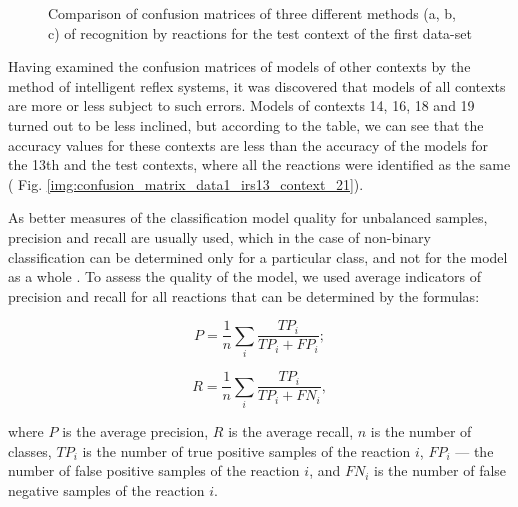 \begin{figure}[!t]
	\centering
	
	\caption{Comparison of confusion matrices of three different methods (a, b, c) of recognition by reactions for the test context of the first data-set}
	\label{img:confusion_matrix_data1_context_21}
\end{figure}

Having examined the confusion matrices of models of other contexts by the method of intelligent reflex systems, it was discovered that models of all contexts are more or less subject to such errors. Models of contexts 14, 16, 18 and 19 turned out to be less inclined, but according to the table, we can see that the accuracy values for these contexts are less than the accuracy of the models for the 13th and the test contexts, where all the reactions were identified as the same ( Fig. \ref{img:confusion_matrix_data1_irs13_context_21}).

As better measures of the classification model quality for unbalanced samples, precision and recall are usually used, which in the case of non-binary classification can be determined only for a particular class, and not for the model as a whole \cite{Powers_2011}. To assess the quality of the model, we used average indicators of precision and recall for all reactions that can be determined by the formulas:

\begin{equation}
\label{eq:рrecision}
P=\frac{1}{n}\sum\limits_i\frac{TP_i}{TP_i+FP_i};
\end{equation}

\begin{equation}
\label{eq:recall}
R=\frac{1}{n}\sum\limits_i\frac{TP_i}{TP_i+FN_i},
\end{equation}

where $P$ is the average precision, $R$ is the average recall, $n$ is the number of classes, $TP_i$ is the number of true positive samples of the reaction $i$, $FP_i$ --- the number of false positive samples of the reaction $i$, and $FN_i$ is the number of false negative samples of the reaction $i$.

